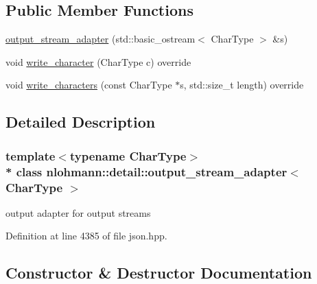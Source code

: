 \subsection*{Public Member Functions}
\begin{DoxyCompactItemize}
\item 
\hyperlink{classnlohmann_1_1detail_1_1output__stream__adapter_a4e78a9bd19cbf3a4191adc62d14f0055}{output\+\_\+stream\+\_\+adapter} (std\+::basic\+\_\+ostream$<$ Char\+Type $>$ \&s)
\item 
void \hyperlink{classnlohmann_1_1detail_1_1output__stream__adapter_a6e2698c76b200b2d8fac6cebfc43a245}{write\+\_\+character} (Char\+Type c) override
\item 
void \hyperlink{classnlohmann_1_1detail_1_1output__stream__adapter_ad61375497a7d03cb0bdcddfdaad185d0}{write\+\_\+characters} (const Char\+Type $\ast$s, std\+::size\+\_\+t length) override
\end{DoxyCompactItemize}


\subsection{Detailed Description}
\subsubsection*{template$<$typename Char\+Type$>$\\*
class nlohmann\+::detail\+::output\+\_\+stream\+\_\+adapter$<$ Char\+Type $>$}

output adapter for output streams 

Definition at line 4385 of file json.\+hpp.



\subsection{Constructor \& Destructor Documentation}

